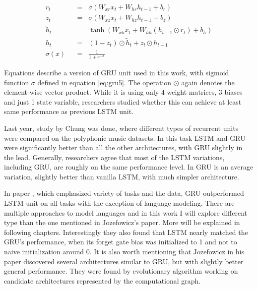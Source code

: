 \begin{align}
r_t \hspace{7pt}&=\hspace{7pt} \sigma(W_{xr}x_t + W_{hr}h_{t-1} + b_r) \label{eq:gru1}\\
z_t \hspace{7pt}&=\hspace{7pt} \sigma(W_{xz}x_t + W_{hz}h_{t-1} + b_z) \label{eq:gru2}\\
\widetilde{h}_t \hspace{7pt}&=\hspace{7pt} \tanh(W_{xh}x_t + W_{hh}(h_{t-1}\odot r_t) + b_h) \label{eq:gru3}\\
h_t \hspace{7pt}&=\hspace{7pt} (1-z_t)\odot \widetilde{h}_t + z_t\odot h_{t-1} \label{eq:gru4}\\[16pt]
\sigma(x) \hspace{7pt}&=\hspace{7pt} \frac{1}{1+e^{-x}} \label{eq:gru5}
\end{align}

Equations describe a version of GRU unit used in this work, with sigmoid function $ \sigma $ defined in equation \eqref{eq:gru5}. The operation $ \odot $ again denotes the element-wise vector product. While it is using only 4 weight matrices, 3 biases and just 1 state variable, researchers studied whether this can achieve at least same performance as previous LSTM unit.

Last year, study by Chung \cite{DBLP:journals/corr/ChungGCB14} was done, where different types of recurrent units were compared on the polyphonic music datasets. In this task LSTM and GRU were significantly better than all the other architectures, with GRU slightly in the lead. Generally, researchers agree that most of the LSTM variations, including GRU, are roughly on the same performance level. In \cite{DBLP:journals/corr/GreffSKSS15} GRU is an average variation, slightly better than vanilla LSTM, with much simpler architecture.

In paper \cite{DBLP:conf/icml/JozefowiczZS15}, which emphasized variety of tasks and the data, GRU outperformed LSTM unit on all tasks with the exception of language modeling. There are multiple approaches to model languages and in this work I will explore different type than the one mentioned in Jozefowicz's \cite{DBLP:conf/icml/JozefowiczZS15} paper. More will be explained in following chapters. Interestingly they also found that LSTM nearly matched the GRU's performance, when its forget gate bias was initialized to 1 and not to naive initialization around 0.
It is also worth mentioning that Jozefowicz in his paper discovered several architectures similar to GRU, but with slightly better general performance. They were found by evolutionary algorithm working on candidate architectures  represented by the computational graph.


